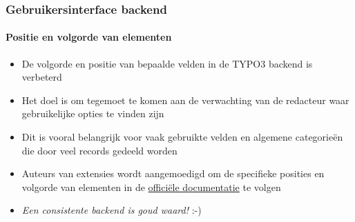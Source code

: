 \begin{frame}[fragile]
	\frametitle{Gebruikersinterface backend}
	\framesubtitle{Positie en volgorde van elementen}

	\begin{itemize}
		\item De volgorde en positie van bepaalde velden in de TYPO3 backend is verbeterd
		\item Het doel is om tegemoet te komen aan de verwachting van de redacteur waar gebruikelijke opties te vinden zijn
		\item Dit is vooral belangrijk voor vaak gebruikte velden en algemene categorieën die door veel records gedeeld worden
		\item Auteurs van extensies wordt aangemoedigd om de specifieke posities en volgorde van elementen in
			de \href{https://docs.typo3.org}{officiële documentatie} te volgen


	\end{itemize}

	\begin{itemize}
		\item \textit{Een consistente backend is goud waard!} :-)
	\end{itemize}

\end{frame}

